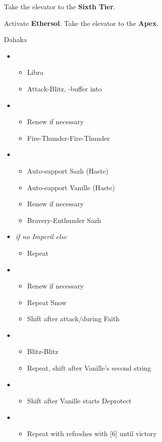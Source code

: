 \begin{multicols}{2}
Take the elevator to the \textbf{Sixth Tier}.

Activate \textbf{Ethersol}.
Take the elevator to the \textbf{Apex}.
\begin{battle}{Dahaka}
\begin{itemize}
    \item \second
    \begin{itemize}
        \item Libra
        \item Attack-Blitz, \rav-buffer into
    \end{itemize}
    \item \fifth
    \begin{itemize}
        \item Renew if necessary
        \item Fire-Thunder-Fire-Thunder
    \end{itemize}
    \item \first
    \begin{itemize}
        \item Auto-support Sazh (Haste)
        \item Auto-support Vanille (Haste)
        \item Renew if necessary
        \item Bravery-Enthunder Sazh
    \end{itemize}
    \item \fifth \textit{ if no Imperil else } \third
    \begin{itemize}
        \item Repeat
    \end{itemize}
    \item \first
    \begin{itemize}
        \item Renew if necessary
        \item Repeat Snow
        \item Shift after attack/during Faith
    \end{itemize}
    \item \second
    \begin{itemize}
        \item Blitz-Blitz
        \item Repeat, shift after Vanille's second string
    \end{itemize}
    \item \fifth
    \begin{itemize}
        \item Shift after Vanille starts Deprotect
    \end{itemize}
    \item \fourth
    \begin{itemize}
        \item Repeat with refreshes with [6] until victory
    \end{itemize}
\end{itemize}
\end{battle}
\end{multicols}
